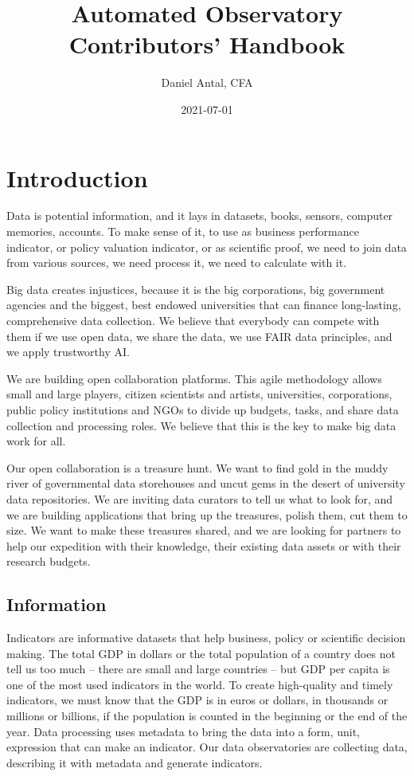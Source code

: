 \documentclass[
  a4paper,
  openany, a4paper, oneside]{book}
\title{Automated Observatory Contributors' Handbook}
\author{Daniel Antal, CFA}
\date{2021-07-01}
\begin{document}
\maketitle

{
\hypersetup{linkcolor=}
\setcounter{tocdepth}{1}
\tableofcontents
}
\listoffigures
{}
\hypertarget{introduction}{%
\chapter*{Introduction}\label{introduction}}

Data is potential information, and it lays in datasets, books, sensors, computer memories, accounts. To make sense of it, to use as business performance indicator, or policy valuation indicator, or as scientific proof, we need to join data from various sources, we need process it, we need to calculate with it.

Big data creates injustices, because it is the big corporations, big government agencies and the biggest, best endowed universities that can finance long-lasting, comprehensive data collection. We believe that everybody can compete with them if we use open data, we share the data, we use FAIR data principles, and we apply trustworthy AI.

We are building open collaboration platforms. This agile methodology allows small and large players, citizen scientists and artists, universities, corporations, public policy institutions and NGOs to divide up budgets, tasks, and share data collection and processing roles. We believe that this is the key to make big data work for all.

Our open collaboration is a treasure hunt. We want to find gold in the muddy river of governmental data storehouses and uncut gems in the desert of university data repositories. We are inviting data curators to tell us what to look for, and we are building applications that bring up the treasures, polish them, cut them to size. We want to make these treasures shared, and we are looking for partners to help our expedition with their knowledge, their existing data assets or with their research budgets.

\hypertarget{information}{%
\section{Information}\label{information}}

Indicators are informative datasets that help business, policy or scientific decision making. The total GDP in dollars or the total population of a country does not tell us too much -- there are small and large countries -- but GDP per capita is one of the most used indicators in the world. To create high-quality and timely indicators, we must know that the GDP is in euros or dollars, in thousands or millions or billions, if the population is counted in the beginning or the end of the year. Data processing uses metadata to bring the data into a form, unit, expression that can make an indicator. Our data observatories are collecting data, describing it with metadata and generate indicators.
\end{document}
